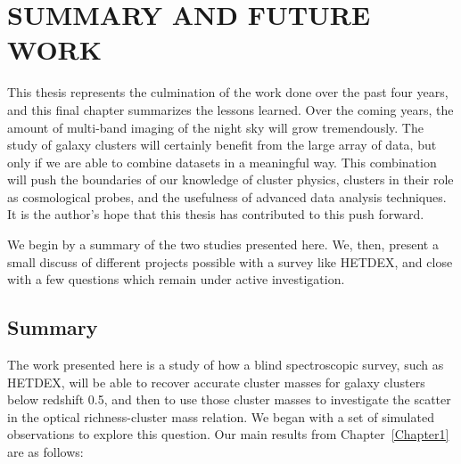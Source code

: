 %
%
%



\chapter[\uppercase{Summary and Future Work}]{\uppercase{Summary and Future Work}}

This thesis represents the culmination of the work done over the past four years, and this final chapter summarizes the lessons learned. Over the coming years, the amount of multi-band imaging of the night sky will grow tremendously. The study of galaxy clusters will certainly benefit from the large array of data, but only if we are able to combine datasets in a meaningful way. This combination will push the boundaries of our knowledge of cluster physics, clusters in their role as cosmological probes, and the usefulness of advanced data analysis techniques. It is the author's hope that this thesis has contributed to this push forward. 

We begin by a summary of the two studies presented here. We, then, present a small discuss of different projects possible with a survey like HETDEX, and close with a few questions which remain under active investigation.

\section{Summary} 
The work presented here is a study of how a blind spectroscopic survey, such as HETDEX, will be able to recover accurate cluster masses for galaxy clusters below redshift 0.5, and then to use those cluster masses to investigate the scatter in the optical richness-cluster mass relation. We began with a set of simulated observations to explore this question. Our main results from Chapter~\ref{Chapter1} are as follows:

